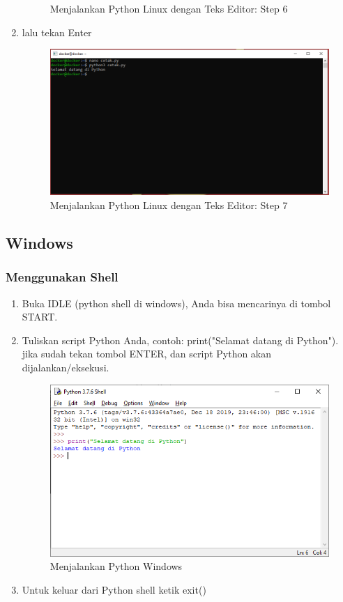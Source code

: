 \begin{enumerate}
\begin{figure}[H]
        \caption{Menjalankan Python Linux dengan Teks Editor: Step 6}
\end{figure}
\item lalu tekan Enter
\begin{figure}[H]
        \centerline{\includegraphics[scale=0.5]{figures/menjalankan-python-linux-with-nano/step7}}
        \caption{Menjalankan Python Linux dengan Teks Editor: Step 7}
\end{figure}
\end{enumerate}

\subsection{Windows}
\subsubsection{Menggunakan Shell}
\begin{enumerate}
\item Buka IDLE (python shell di windows), Anda bisa mencarinya di tombol START.
\item Tuliskan script Python Anda, contoh: print("Selamat datang di Python"). jika sudah tekan tombol ENTER, dan script Python akan dijalankan/eksekusi.
\begin{figure}[H]
        \centerline{\includegraphics[scale=0.75]{figures/menjalankan-python-windows/step1}}
        \caption{Menjalankan Python Windows}
        \label{windowsshellpython}
\end{figure}
\item Untuk keluar dari Python shell ketik exit()
\end{enumerate}

